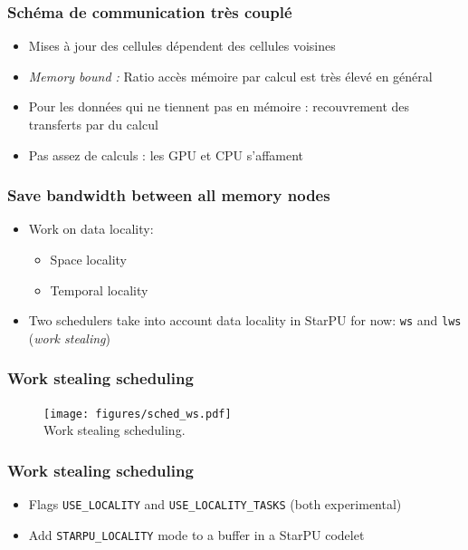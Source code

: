 \documentclass[10pt,a4paper]{beamer}
\begin{document}
\begin{frame}
\frametitle{Schéma de communication très couplé}
  \begin{itemize}
  \item Mises à jour des cellules dépendent des cellules voisines
  \item \textit{Memory bound :} Ratio accès mémoire par calcul est très élevé en général
  \item Pour les données qui ne tiennent pas en mémoire : recouvrement des transferts par du calcul
  \item Pas assez de calculs : les GPU et CPU s'affament
  \end{itemize}
\end{frame}

\begin{frame}
\frametitle{Save bandwidth between all memory nodes}
  \begin{itemize}
    \vfill
  \item Work on data locality:
    \begin{itemize}
    \item Space locality
    \item Temporal locality
    \end{itemize}
    \vfill
  \item Two schedulers take into account data locality in StarPU for now: \texttt{ws} and \texttt{lws} (\textit{work stealing})
    \vfill
  \end{itemize}
\end{frame}

\begin{frame}
  \frametitle{Work stealing scheduling}
  \vfill
  \begin{figure}
    \center
    \texttt{[image: figures/sched\_ws.pdf]} \\
    \small{Work stealing scheduling.}
  \end{figure}
  \vfill
\end{frame}

\begin{frame}
  \frametitle{Work stealing scheduling}
  \begin{itemize}
  \vfill
  \item Flags \texttt{USE\_LOCALITY} and \texttt{USE\_LOCALITY\_TASKS} (both experimental)
    \vfill
  \item Add \texttt{STARPU\_LOCALITY} mode to a buffer in a StarPU codelet
  \vfill
  \end{itemize}
\end{frame}
\end{document}
